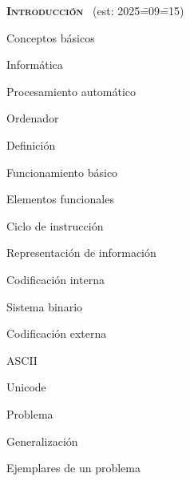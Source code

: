 \begin{longenum}
    \item \textbf{\textsc{Introducción}} \ (est: 2025\==09\==15)
    \begin{longenum}
        \item Conceptos básicos
        \begin{longenum}
            \item Informática
            \begin{longenum}
                \item Procesamiento automático
            \end{longenum}
            \item Ordenador
            \begin{longenum}
                \item Definición
                \item Funcionamiento básico
                \begin{longenum}
                    \item Elementos funcionales
                    \item Ciclo de instrucción
                    \item Representación de información
                    \begin{longenum}
                        \item Codificación interna
                        \begin{longenum}
                            \item Sistema binario
                        \end{longenum}
                        \item Codificación externa
                        \begin{longenum}
                            \item ASCII
                            \item Unicode
                        \end{longenum}
                    \end{longenum}
                \end{longenum}
            \end{longenum}
            \item Problema
            \begin{longenum}
                \item Generalización
                \item Ejemplares de un problema

\end{longenum}
\end{longenum}
\end{longenum}
\end{longenum}
